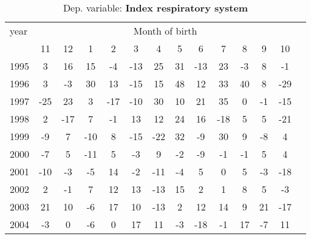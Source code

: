  \begin{table}[H] \begin{threeparttable} \centering \caption{Dep. variable: \textbf{Index respiratory system}} {\def\sym#1{\ifmmode^{#1}\else\(^{#1}\)\fi} \begin{tabular}{l*{13}{c}} \toprule year & \multicolumn{12}{c}{Month of birth} \\ \cmidrule(lr){2-13} 
            &          11&          12&           1&           2&           3&           4&           5&           6&           7&           8&           9&          10\\
1995        &           3&          16&          15&          -4&         -13&          25&          31&         -13&          23&          -3&           8&          -1\\
1996        &           3&          -3&          30&          13&         -15&          15&          48&          12&          33&          40&           8&         -29\\
1997        &         -25&          23&           3&         -17&         -10&          30&          10&          21&          35&           0&          -1&         -15\\
1998        &           2&         -17&           7&          -1&          13&          12&          24&          16&         -18&           5&           5&         -21\\
1999        &          -9&           7&         -10&           8&         -15&         -22&          32&          -9&          30&           9&          -8&           4\\
2000        &          -7&           5&         -11&           5&          -3&           9&          -2&          -9&          -1&          -1&           5&           4\\
2001        &         -10&          -3&          -5&          14&          -2&         -11&          -4&           5&           0&           5&          -3&         -18\\
2002        &           2&          -1&           7&          12&          13&         -13&          15&           2&           1&           8&           5&          -3\\
2003        &          21&          10&          -6&          17&          10&         -13&           2&          12&          14&           9&          21&         -17\\
2004        &          -3&           0&          -6&           0&          17&          11&          -3&         -18&          -1&          17&          -7&          11\\

\end{tabular}}
\end{threeparttable}
\end{table}
